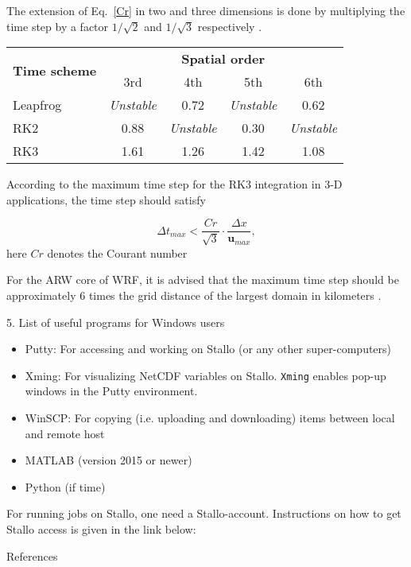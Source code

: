 \documentclass{beamer}
\newcommand{\ub}{\bm {u}\xspace}						%
\begin{document}
\begin{frame}
The extension of Eq.~\ref{Cr} in two and three dimensions is done by multiplying the time step by a factor $1/\sqrt{2}$ and $1/\sqrt{3}$ respectively \citep{wicker2002time}.
\begin{table}[htp]
\centering
\begin{tabular}{ p{4 cm} | c | c | c | c}
	\hline
	\multirow{2}{*}{\textbf{Time scheme}} 	& \multicolumn{4}{c}{\textbf{Spatial order}}\\
	& 3rd	& 4th	 	& 5th 	& 6th \\
	\hline
	Leapfrog 	& \textit{Unstable}	& 0.72			& \textit{Unstable}	& 0.62\\
	RK2 		& 0.88			& \textit{Unstable}	& 0.30 			& \textit{Unstable}\\
	RK3 		& 1.61 			& 1.26			& 1.42			& 1.08\\
	\hline
\end{tabular}
\end{table}
According to %
the maximum time step for the RK3 integration in 3-D applications, the time step should satisfy

\begin{equation}
\Delta t_{max} < \frac{Cr}{\sqrt{3}}\cdot\frac{\Delta x}{\ub_{max}},
\label{deltatmax}
\end{equation}
here $Cr$ denotes the Courant number

For the ARW core of WRF, it is advised that the maximum time step should be approximately 6 times the grid distance of the largest domain in kilometers \citep{skamarock2008description}.

\end{frame}

\begin{frame}{5. List of useful programs for Windows users}
\begin{itemize}
	\item Putty: For accessing and working on Stallo (or any other super-computers)
	\item Xming: For visualizing NetCDF variables on Stallo. \texttt{Xming} enables pop-up windows in the Putty environment.
	\item WinSCP: For copying (i.e. uploading and downloading) items between local and remote host
	\item MATLAB (version 2015 or newer)
	\item Python (if time)	
\end{itemize}
For running jobs on Stallo, one need a Stallo-account. Instructions on how to get Stallo access is given in the link below:\\
\end{frame}

\begin{frame}[fragile, t]{References}


\end{frame}
\end{document}
